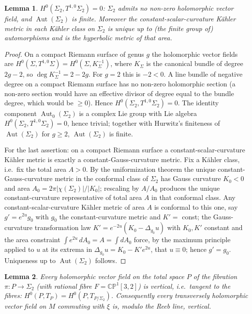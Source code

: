 \documentclass{amsart}
\newtheorem{lemma}{Lemma}
\theoremstyle{definition}
\DeclareMathOperator{\Aut}{Aut}
\begin{document}
\begin{lemma}\label{lem:rigidbase}
$H^0(\Sigma_2,T^{1,0}\Sigma_2)=0$: $\Sigma_2$ admits no non-zero holomorphic
vector field, and $\Aut(\Sigma_2)$ is finite. Moreover the constant-scalar-curvature
K\"ahler metric in each K\"ahler class on $\Sigma_2$ is unique up to (the finite
group of) automorphisms and is the hyperbolic metric of that area.
\end{lemma}

\begin{proof}
On a compact Riemann surface of genus $g$ the holomorphic vector fields are
$H^0(\Sigma,T^{1,0}\Sigma)=H^0(\Sigma,K_\Sigma^{-1})$, where $K_\Sigma$ is the
canonical bundle of degree $2g-2$, so $\deg K_\Sigma^{-1}=2-2g$. For $g=2$ this
is $-2<0$. A line bundle of negative degree on a compact Riemann surface
has no non-zero holomorphic section (a non-zero section would have an effective
divisor of degree equal to the bundle degree, which would be $\ge 0$). Hence
$H^0(\Sigma_2,T^{1,0}\Sigma_2)=0$. The identity component
$\Aut_0(\Sigma_2)$ is a complex Lie group with Lie algebra
$H^0(\Sigma_2,T^{1,0}\Sigma_2)=0$, hence trivial; together with Hurwitz's
finiteness of $\Aut(\Sigma_2)$ for $g\ge2$, $\Aut(\Sigma_2)$ is finite.

For the last assertion: on a compact Riemann surface a constant-scalar-curvature
K\"ahler metric is exactly a constant-Gauss-curvature metric. Fix a K\"ahler
class, i.e.\ fix the total area $A>0$. By the uniformization theorem the unique
constant-Gauss-curvature metric in the conformal class of $\Sigma_2$ has Gauss
curvature $K_0<0$ and area $A_0=2\pi|\chi(\Sigma_2)|/|K_0|$; rescaling by
$A/A_0$ produces the unique constant-curvature representative of total area $A$
in that conformal class. Any constant-scalar-curvature K\"ahler metric of area
$A$ is conformal to this one, say $g'=e^{2u}g_0$ with $g_0$ the
constant-curvature metric and $K'=$ const; the Gauss-curvature transformation
law $K'=e^{-2u}(K_0-\Delta_{g_0}u)$ with $K_0,K'$ constant and the area
constraint $\int e^{2u}\,dA_0=A=\int dA_0$ force, by the maximum principle
applied to $u$ at its extrema in $\Delta_{g_0}u=K_0-K'e^{2u}$, that $u\equiv0$;
hence $g'=g_0$. Uniqueness up to $\Aut(\Sigma_2)$ follows.
\end{proof}

\begin{lemma}\label{lem:vertical}
Every holomorphic vector field on the total space $P$ of the fibration
$\pi\colon P\to\Sigma_2$ (with rational fibre $F=\mathbb{CP}^1[3,2]$) is
vertical, i.e.\ tangent to the fibres:
$H^0(P,T_P)=H^0(P,T_{P/\Sigma_2})$. Consequently every transversely holomorphic
vector field on $M$ commuting with $\xi$ is, modulo the Reeb line, vertical.
\end{lemma}
\end{document}
